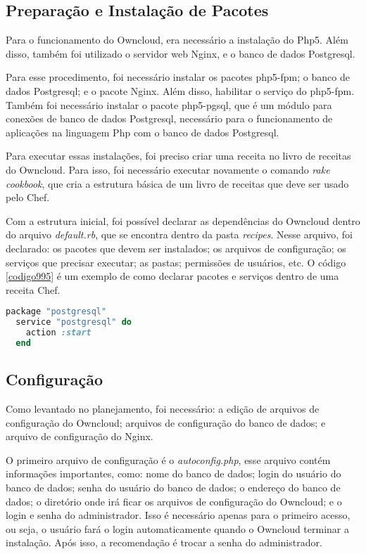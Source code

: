 \subsection{Preparação e Instalação de Pacotes}

Para o funcionamento do Owncloud, era necessário a instalação do Php5. Além
disso, também foi utilizado o servidor web Nginx, e o 
banco de dados Postgresql.

Para esse procedimento, foi necessário instalar os pacotes php5-fpm; o banco
de dados Postgresql; e o pacote Nginx. Além disso, habilitar o serviço do php5-fpm. 
Também foi necessário instalar o pacote php5-pgsql, que é um módulo para
conexões de banco de dados Postgresql, necessário para o funcionamento de
aplicações na linguagem Php com o banco de dados Postgresql.

Para executar essas instalações, foi preciso criar uma receita no livro de receitas
do Owncloud. Para isso, foi necessário executar novamente o comando \textit{rake cookbook}, 
que cria a estrutura básica de um livro de receitas que deve ser usado pelo Chef. 

Com a estrutura inicial, foi possível declarar as dependências do Owncloud
dentro do arquivo \textit{default.rb}, que se encontra dentro da pasta 
\textit{recipes}. Nesse arquivo, foi 
declarado: os pacotes que devem ser instalados; os arquivos de configuração;
os serviços que precisar executar; as pastas; permissões de usuários, etc. O código
\ref{codigo995} é um exemplo
de como declarar pacotes e serviços dentro de uma receita Chef.

\begin{lstlisting}[language=Ruby,label=dice_index,caption={Exemplo de como habilitar serviço do postgresql com chef}, label=codigo995]
  package "postgresql"
  service "postgresql" do
    action :start
  end
\end{lstlisting}

\subsection{Configuração}

Como levantado no planejamento, foi necessário: a edição de arquivos de configuração
do Owncloud; arquivos de configuração do banco de dados; e arquivo de configuração
do Nginx.

O primeiro arquivo de configuração é o \textit{autoconfig.php}, esse arquivo
contém informações importantes, como: nome do banco de dados;
login do usuário do banco de dados; senha do usuário do banco de dados; o endereço 
do banco de dados; o diretório
onde irá ficar os arquivos de configuração do Owncloud; e o login e senha
do administrador. Isso é necessário apenas para o primeiro acesso, ou seja, o usuário
fará o login automaticamente quando o Owncloud terminar a instalação. Após isso,
a recomendação é trocar a senha do administrador.

